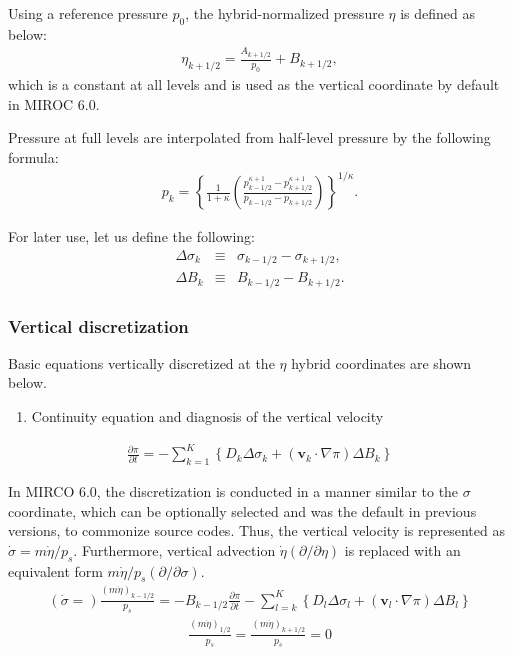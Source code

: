 Using a reference pressure \(p_0\), the hybrid-normalized pressure \(\eta\) is defined as below:
\begin{eqnarray}
\eta_{k+1/2} = \frac{A_{k+1/2}}{p_0} +B_{k+1/2},
\end{eqnarray}
which is a constant at all levels and is used as the vertical coordinate by default in MIROC 6.0.

Pressure at full levels are interpolated from half-level pressure by the following formula:
\begin{eqnarray}
 p_k = \left\{ \frac{1}{1+\kappa}
                     \left( \frac{  p^{\kappa +1}_{k-1/2}
                                  - p^{\kappa +1}_{k+1/2}      }
                                  { p_{k-1/2} - p_{k+1/2} }
                     \right)
              \right\}^{1/\kappa}.
\end{eqnarray}

For later use, let us define the following:
\begin{eqnarray}
  \Delta\sigma_k &\equiv & \sigma_{k-1/2} - \sigma_{k+1/2}, \\
  \Delta B_k &\equiv & B_{k-1/2} - B_{k+1/2}.
\end{eqnarray}

\hypertarget{vertical-discretization-1}{%
\subsubsection{Vertical
discretization}\label{vertical-discretization-1}}

Basic equations vertically discretized at the $\eta$ hybrid coordinates are shown below.

\begin{enumerate}
\def\labelenumi{\arabic{enumi}.}
\tightlist
\item
  Continuity equation and diagnosis of the vertical velocity
\end{enumerate}
\begin{eqnarray}
  \frac{\partial \pi}{\partial t}
 = - \sum_{k=1}^{K} \left\{ D_k \Delta\sigma_k + ({\mathbf{v}}_k \cdot \nabla \pi)\Delta B_k \right\}
\end{eqnarray}

In MIRCO 6.0, the discretization is conducted in a manner similar to the $\sigma$ coordinate,
which can be optionally selected and was the default in previous versions, to commonize source codes.
Thus, the vertical velocity is represented as \(\dot{\sigma}=m\dot{\eta}/p_s\).
Furthermore, vertical advection \(\dot{\eta}(\partial/\partial\eta)\) is replaced with an equivalent form \(m\dot{\eta}/p_s(\partial/\partial\sigma)\).
\begin{eqnarray}
  \left(\dot{\sigma}=\right)\frac{(m\dot{\eta})_{k-1/2}}{p_s}
 = - B_{k-1/2} \frac{\partial \pi}{\partial t}
   - \sum_{l=k}^{K}\left\{ D_l \Delta\sigma_l + ({\mathbf{v}}_l \cdot \nabla \pi)\Delta B_l \right\}
\end{eqnarray}
\begin{eqnarray}
  \frac{(m\dot{\eta})_{1/2}}{p_s} = \frac{(m\dot{\eta})_{k+1/2}}{p_s} = 0
\end{eqnarray}

